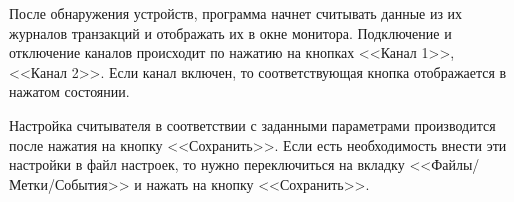 После обнаружения устройств, программа начнет считывать данные из их журналов транзакций и 
отображать их в окне монитора. Подключение и отключение каналов происходит по нажатию на кнопках <<Канал 1>>, <<Канал 2>>.
Если канал включен, то соответствующая кнопка отображается в нажатом состоянии.

Настройка считывателя в соответствии с заданными параметрами производится после нажатия на кнопку <<Сохранить>>.
Если есть необходимость внести эти настройки в файл настроек, то нужно переключиться на вкладку <<Файлы/Метки/События>>
 и нажать на кнопку <<Сохранить>>.


